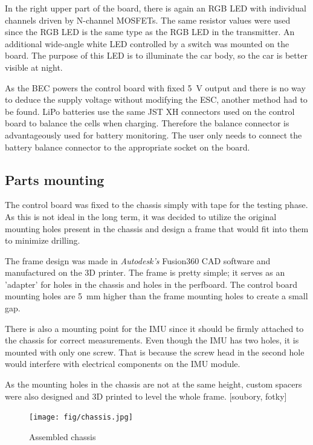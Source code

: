 In the right upper part of the board, there is again an RGB LED with individual channels driven by N-channel MOSFETs. The same resistor values were used since the RGB LED is the same type as the RGB LED in the transmitter. An additional wide-angle white LED controlled by a switch was mounted on the board. The purpose of this LED is to illuminate the car body, so the car is better visible at night.

As the BEC powers the control board with fixed \SI{5}{\V} output and there is no way to deduce the supply voltage without modifying the ESC, another method had to be found. LiPo batteries use the same JST XH connectors used on the control board to balance the cells when charging. Therefore the balance connector is advantageously used for battery monitoring. The user only needs to connect the battery balance connector to the appropriate socket on the board.

\subsection{Parts mounting}
The control board was fixed to the chassis simply with tape for the testing phase. As this is not ideal in the long term, it was decided to utilize the original mounting holes present in the chassis and design a frame that would fit into them to minimize drilling.

The frame design was made in \textit{Autodesk's} Fusion360 CAD software and manufactured on the 3D printer. The frame is pretty simple; it serves as an 'adapter' for holes in the chassis and holes in the perfboard. The control board mounting holes are \SI{5}{\mm} higher than the frame mounting holes to create a small gap.

There is also a mounting point for the IMU since it should be firmly attached to the chassis for correct measurements. Even though the IMU has two holes, it is mounted with only one screw. That is because the screw head in the second hole would interfere with electrical components on the IMU module.

As the mounting holes in the chassis are not at the same height, custom spacers were also designed and 3D printed to level the whole frame.
[\todo soubory, fotky]
\begin{figure}[h]
\centering
\texttt{[image: fig/chassis.jpg]}
\caption{Assembled chassis}
\label{fig:chasis}
\end{figure}
